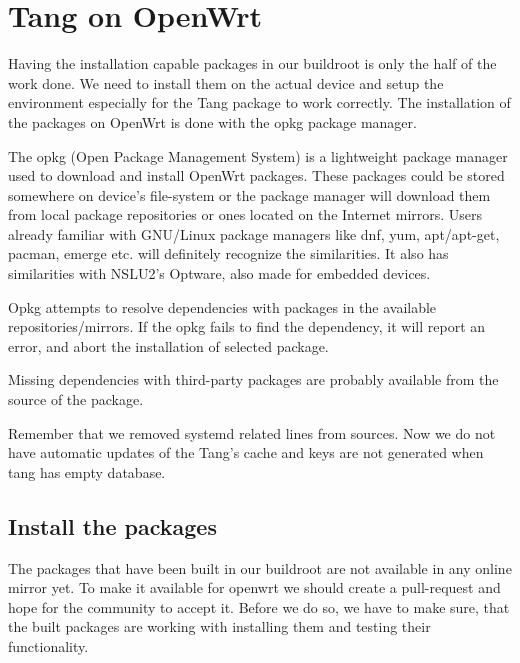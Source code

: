 \chapter{Tang on OpenWrt}\label{config}

Having the installation capable packages in our buildroot is only the half of the work done.
We need to install them on the actual device and setup the environment especially for the Tang package to work correctly.
The installation of the packages on OpenWrt is done with the opkg package manager.

The opkg (Open Package Management System) is a lightweight package manager used to download and install OpenWrt packages.
These packages could be stored somewhere on device's file-system or the package manager will download them from local package repositories or ones located on the Internet mirrors.
Users already familiar with GNU/Linux package managers like dnf, yum, apt/apt-get, pacman, emerge etc. will definitely recognize the similarities.
It also has similarities with NSLU2's Optware, also made for embedded devices.

Opkg attempts to resolve dependencies with packages in the available repositories/mirrors.
If the opkg fails to find the dependency, it will report an error, and abort the installation of selected package.

Missing dependencies with third-party packages are probably available from the source of the package.

Remember that we removed systemd related lines from sources.
Now we do not have automatic updates of the Tang's cache and keys are not generated when tang has empty database.



\section{Install the packages}

The packages that have been built in our buildroot are not available in any online mirror yet.
To make it available for openwrt we should create a pull-request and hope for the community to accept it.
Before we do so, we have to make sure, that the built packages are working with installing them and testing their functionality.

